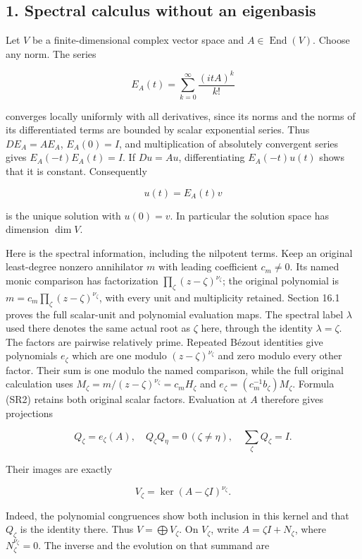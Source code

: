 \documentclass[
  11pt,
]{article}
\begin{document}
\subsection{1. Spectral calculus without an
eigenbasis}\label{spectral-calculus-without-an-eigenbasis}

Let \(V\) be a finite-dimensional complex vector space and
\(A\in\operatorname{End}(V)\). Choose any norm. The series

\[
E_A(t)=\sum_{k=0}^{\infty}\frac{(itA)^k}{k!}
\]

converges locally uniformly with all derivatives, since its norms and
the norms of its differentiated terms are bounded by scalar exponential
series. Thus \(DE_A=AE_A\), \(E_A(0)=I\), and multiplication of
absolutely convergent series gives \(E_A(-t)E_A(t)=I\). If \(Du=Au\),
differentiating \(E_A(-t)u(t)\) shows that it is constant. Consequently

\[
u(t)=E_A(t)v                                                 \tag{S1}
\]

is the unique solution with \(u(0)=v\). In particular the solution space
has dimension \(\dim V\).

Here is the spectral information, including the nilpotent terms. Keep an
original least-degree nonzero annihilator \(m\) with leading coefficient
\(c_m\ne0\). Its named monic comparison has factorization
\(\prod_{\zeta}(z-\zeta)^{\nu_\zeta}\); the original polynomial is
\(m=c_m\prod_{\zeta}(z-\zeta)^{\nu_\zeta}\), with every unit and
multiplicity retained. Section 16.1 proves the full scalar-unit and
polynomial evaluation maps. The spectral label \(\lambda\) used there
denotes the same actual root as \(\zeta\) here, through the identity
\(\lambda=\zeta\). The factors are pairwise relatively prime. Repeated
Bézout identities give polynomials \(e_\zeta\) which are one modulo
\((z-\zeta)^{\nu_\zeta}\) and zero modulo every other factor. Their sum
is one modulo the named comparison, while the full original calculation
uses \(M_\zeta=m/(z-\zeta)^{\nu_\zeta}=c_mH_\zeta\) and
\(e_\zeta=(c_m^{-1}b_\zeta)M_\zeta\). Formula (SR2) retains both
original scalar factors. Evaluation at \(A\) therefore gives projections

\[
Q_\zeta=e_\zeta(A),\quad
Q_\zeta Q_\eta=0\ (\zeta\ne\eta),\quad
\sum_\zeta Q_\zeta=I.
\]

Their images are exactly

\[
V_\zeta=\ker(A-\zeta I)^{\nu_\zeta}.
\]

Indeed, the polynomial congruences show both inclusion in this kernel
and that \(Q_\zeta\) is the identity there. Thus
\(V=\bigoplus V_\zeta\). On \(V_\zeta\), write \(A=\zeta I+N_\zeta\),
where \(N_\zeta^{\nu_\zeta}=0\). The inverse and the evolution on that
summand are
\end{document}
